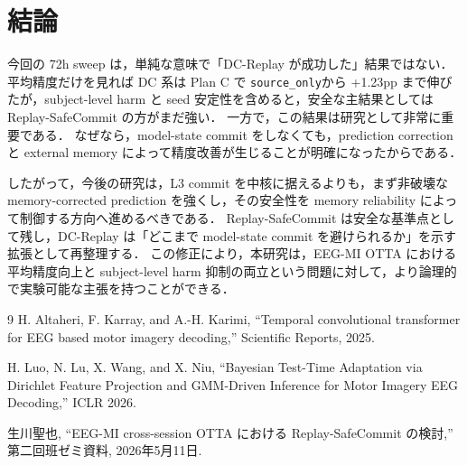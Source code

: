 \documentclass[a4paper,11pt]{ltjsarticle}
\newcommand{\source}{\texttt{source\_only}}
\begin{document}
\section{結論}

今回の 72h sweep は，単純な意味で「DC-Replay が成功した」結果ではない．
平均精度だけを見れば DC 系は Plan C で \source から +1.23pp まで伸びたが，subject-level harm と seed 安定性を含めると，安全な主結果としては Replay-SafeCommit の方がまだ強い．
一方で，この結果は研究として非常に重要である．
なぜなら，model-state commit をしなくても，prediction correction と external memory によって精度改善が生じることが明確になったからである．

したがって，今後の研究は，L3 commit を中核に据えるよりも，まず非破壊な memory-corrected prediction を強くし，その安全性を memory reliability によって制御する方向へ進めるべきである．
Replay-SafeCommit は安全な基準点として残し，DC-Replay は「どこまで model-state commit を避けられるか」を示す拡張として再整理する．
この修正により，本研究は，EEG-MI OTTA における平均精度向上と subject-level harm 抑制の両立という問題に対して，より論理的で実験可能な主張を持つことができる．

\begin{thebibliography}{9}
H. Altaheri, F. Karray, and A.-H. Karimi,
``Temporal convolutional transformer for EEG based motor imagery decoding,''
Scientific Reports, 2025.

H. Luo, N. Lu, X. Wang, and X. Niu,
``Bayesian Test-Time Adaptation via Dirichlet Feature Projection and GMM-Driven Inference for Motor Imagery EEG Decoding,''
ICLR 2026.

生川聖也,
``EEG-MI cross-session OTTA における Replay-SafeCommit の検討,''
第二回班ゼミ資料, 2026年5月11日.
\end{thebibliography}
\end{document}
